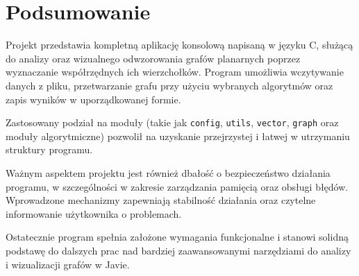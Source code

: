\documentclass[11pt,a4paper]{article}
\begin{document}
\section{Podsumowanie}

Projekt przedstawia kompletną aplikację konsolową napisaną w języku C, służącą do analizy oraz wizualnego odwzorowania grafów planarnych poprzez wyznaczanie współrzędnych ich wierzchołków. Program umożliwia wczytywanie danych z pliku, przetwarzanie grafu przy użyciu wybranych algorytmów oraz zapis wyników w uporządkowanej formie.

Zastosowany podział na moduły (takie jak \verb|config|, \verb|utils|, \verb|vector|, \verb|graph| oraz moduły algorytmiczne) pozwolił na uzyskanie przejrzystej i łatwej w utrzymaniu struktury programu.

Ważnym aspektem projektu jest również dbałość o bezpieczeństwo działania programu, w szczególności w zakresie zarządzania pamięcią oraz obsługi błędów. Wprowadzone mechanizmy zapewniają stabilność działania oraz czytelne informowanie użytkownika o problemach.

Ostatecznie program spełnia założone wymagania funkcjonalne i stanowi solidną podstawę do dalszych prac nad bardziej zaawansowanymi narzędziami do analizy i wizualizacji grafów w Javie.
\end{document}
